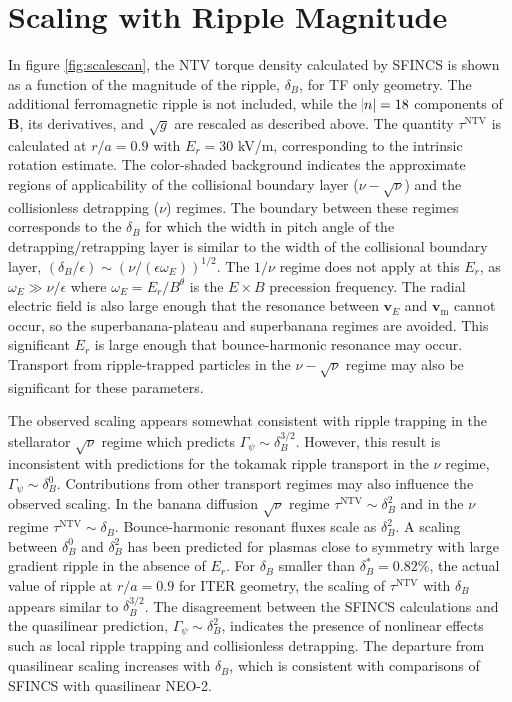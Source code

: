 \documentclass[aip, pop, preprint]{revtex4-1}
\numberwithin{figure}{section}
\numberwithin{equation}{section}
\begin{document}
\section{Scaling with Ripple Magnitude}\label{scaling}
In figure \ref{fig:scalescan}, the NTV torque density calculated by SFINCS is shown as a function of the magnitude of the ripple, $\delta_B$, for TF only geometry. The additional ferromagnetic ripple is not included, while the $\abs{n}=18$ components of $\bm{B}$, its derivatives, and $\sqrt{g}$ are rescaled as described above. The quantity $\tau^{\text{NTV}}$ is calculated at $r/a = 0.9$ with $E_r = 30$ kV/m, corresponding to the intrinsic rotation estimate. The color-shaded background indicates the approximate regions of applicability of the collisional boundary layer ($\nu-\sqrt{\nu}$) and the collisionless detrapping ($\nu$) regimes. The boundary between these regimes corresponds to the $\delta_B$ for which the width in pitch angle of the detrapping/retrapping layer is similar to the width of the collisional boundary layer, $(\delta_B/\epsilon) \sim (\nu/(\epsilon \omega_E))^{1/2}$. The $1/\nu$ regime\cite{Shaing2003} does not apply at this $E_r$, as $\omega_E \gg \nu/\epsilon$ where $\omega_E = E_r/B^{\theta}$ is the $E\times B$ precession frequency. The radial electric field is also large enough that the resonance between $\bm{v}_{E}$ and $\bm{v}_{\text{m}}$ cannot occur, so the superbanana-plateau \cite{Shaing2009_sbp} and superbanana \cite{Shaing2009_sb} regimes are avoided. This significant $E_r$ is large enough that bounce-harmonic resonance may occur.\cite{Park2009} Transport from ripple-trapped particles in the $\nu- \sqrt{\nu}$ regime may also be significant for these parameters.

The observed scaling appears somewhat consistent with ripple trapping in the stellarator $\sqrt{\nu}$ regime\cite{Ho1987} which predicts $\Gamma_{\psi} \sim \delta_B^{3/2}$. However, this result is inconsistent with predictions for the tokamak ripple transport in the $\nu$ regime, $\Gamma_{\psi} \sim \delta_B^0$.\cite{Tsang1977,Linsker1982} Contributions from other transport regimes may also influence the observed scaling. In the banana diffusion $\sqrt{\nu}$ regime $\tau^{\text{NTV}} \sim \delta_B^2$ and in the $\nu$ regime $\tau^{\text{NTV}} \sim \delta_B$. Bounce-harmonic resonant fluxes scale as $\delta_B^2$.\cite{Park2009} A scaling between $\delta_B^0$ and $\delta_B^{2}$ has been predicted for plasmas close to symmetry with large gradient ripple in the absence of $E_r$.\cite{Calvo2014} For $\delta_B$ smaller than $\delta_B^* = 0.82\%$, the actual value of ripple at $r/a=0.9$ for ITER geometry, the scaling of $\tau^{\text{NTV}}$ with $\delta_B$ appears similar to $\delta_B^{3/2}$. The disagreement between the SFINCS calculations and the quasilinear prediction, $\Gamma_{\psi} \sim \delta_B^2$, indicates the presence of nonlinear effects such as local ripple trapping and collisionless detrapping. The departure from quasilinear scaling increases with $\delta_B$, which is consistent with comparisons of SFINCS with quasilinear NEO-2.\cite{Martitsch2016} 
\end{document}
